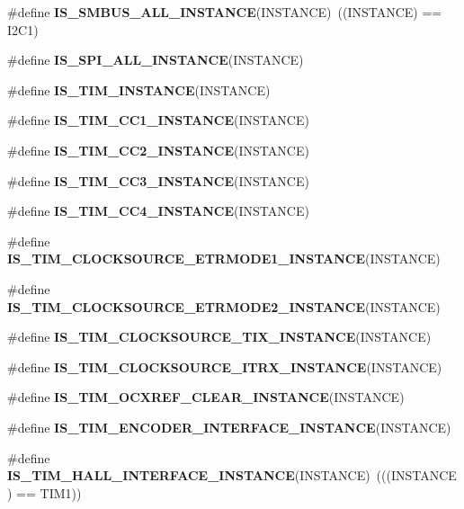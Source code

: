 \begin{DoxyCompactItemize}
\#define {\bfseries I\+S\+\_\+\+S\+M\+B\+U\+S\+\_\+\+A\+L\+L\+\_\+\+I\+N\+S\+T\+A\+N\+CE}(I\+N\+S\+T\+A\+N\+CE)~((I\+N\+S\+T\+A\+N\+CE) == I2\+C1)
\item 
\#define {\bfseries I\+S\+\_\+\+S\+P\+I\+\_\+\+A\+L\+L\+\_\+\+I\+N\+S\+T\+A\+N\+CE}(I\+N\+S\+T\+A\+N\+CE)
\item 
\#define {\bfseries I\+S\+\_\+\+T\+I\+M\+\_\+\+I\+N\+S\+T\+A\+N\+CE}(I\+N\+S\+T\+A\+N\+CE)
\item 
\#define {\bfseries I\+S\+\_\+\+T\+I\+M\+\_\+\+C\+C1\+\_\+\+I\+N\+S\+T\+A\+N\+CE}(I\+N\+S\+T\+A\+N\+CE)
\item 
\#define {\bfseries I\+S\+\_\+\+T\+I\+M\+\_\+\+C\+C2\+\_\+\+I\+N\+S\+T\+A\+N\+CE}(I\+N\+S\+T\+A\+N\+CE)
\item 
\#define {\bfseries I\+S\+\_\+\+T\+I\+M\+\_\+\+C\+C3\+\_\+\+I\+N\+S\+T\+A\+N\+CE}(I\+N\+S\+T\+A\+N\+CE)
\item 
\#define {\bfseries I\+S\+\_\+\+T\+I\+M\+\_\+\+C\+C4\+\_\+\+I\+N\+S\+T\+A\+N\+CE}(I\+N\+S\+T\+A\+N\+CE)
\item 
\#define {\bfseries I\+S\+\_\+\+T\+I\+M\+\_\+\+C\+L\+O\+C\+K\+S\+O\+U\+R\+C\+E\+\_\+\+E\+T\+R\+M\+O\+D\+E1\+\_\+\+I\+N\+S\+T\+A\+N\+CE}(I\+N\+S\+T\+A\+N\+CE)
\item 
\#define {\bfseries I\+S\+\_\+\+T\+I\+M\+\_\+\+C\+L\+O\+C\+K\+S\+O\+U\+R\+C\+E\+\_\+\+E\+T\+R\+M\+O\+D\+E2\+\_\+\+I\+N\+S\+T\+A\+N\+CE}(I\+N\+S\+T\+A\+N\+CE)
\item 
\#define {\bfseries I\+S\+\_\+\+T\+I\+M\+\_\+\+C\+L\+O\+C\+K\+S\+O\+U\+R\+C\+E\+\_\+\+T\+I\+X\+\_\+\+I\+N\+S\+T\+A\+N\+CE}(I\+N\+S\+T\+A\+N\+CE)
\item 
\#define {\bfseries I\+S\+\_\+\+T\+I\+M\+\_\+\+C\+L\+O\+C\+K\+S\+O\+U\+R\+C\+E\+\_\+\+I\+T\+R\+X\+\_\+\+I\+N\+S\+T\+A\+N\+CE}(I\+N\+S\+T\+A\+N\+CE)
\item 
\#define {\bfseries I\+S\+\_\+\+T\+I\+M\+\_\+\+O\+C\+X\+R\+E\+F\+\_\+\+C\+L\+E\+A\+R\+\_\+\+I\+N\+S\+T\+A\+N\+CE}(I\+N\+S\+T\+A\+N\+CE)
\item 
\#define {\bfseries I\+S\+\_\+\+T\+I\+M\+\_\+\+E\+N\+C\+O\+D\+E\+R\+\_\+\+I\+N\+T\+E\+R\+F\+A\+C\+E\+\_\+\+I\+N\+S\+T\+A\+N\+CE}(I\+N\+S\+T\+A\+N\+CE)
\item 
\mbox{\label{group___exported__macro_gacdcc047699e2d83c9d2b3a3f8375dff4}} 
\#define {\bfseries I\+S\+\_\+\+T\+I\+M\+\_\+\+H\+A\+L\+L\+\_\+\+I\+N\+T\+E\+R\+F\+A\+C\+E\+\_\+\+I\+N\+S\+T\+A\+N\+CE}(I\+N\+S\+T\+A\+N\+CE)~(((I\+N\+S\+T\+A\+N\+CE) == T\+I\+M1))
\item 

\end{DoxyCompactItemize}
